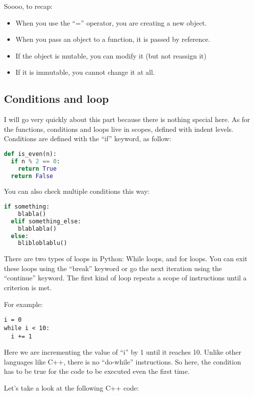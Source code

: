 \vspace{5mm}

Soooo, to recap:

\begin{itemize}
\item When you use the ``='' operator, you are creating a new object.
\item When you pass an object to a function, it is passed by reference.
\item If the object is mutable, you can modify it (but not reassign it)
\item If it is immutable, you cannot change it at all.
\end{itemize}

\subsection{Conditions and loop}
I will go very quickly about this part because there is nothing special here.
As for the functions, conditions and loops live in scopes, defined with indent levels.
Conditions are defined with the ``if'' keyword, as follow:

\begin{lstlisting}[language=python]
def is_even(n):
  if n % 2 == 0:
    return True
  return False
\end{lstlisting}

You can also check multiple conditions this way:
\begin{lstlisting}[language=python]
  if something:
    blabla()
  elif something_else:
    blablabla()
  else:
    blibloblablu()
\end{lstlisting}


There are two types of loops in Python: While loops, and for loops. You can exit
these loops using the ``break'' keyword or go the next iteration using the ``continue''
keyword. The first kind of loop repeats a scope of instructions until a criterion is met.

For example:

\begin{lstlisting}
i = 0
while i < 10:
  i += 1
\end{lstlisting}

Here we are incrementing the value of ``i'' by 1 until it reaches 10. Unlike other
languages like C++, there is no ``do-while'' instructions. So here, the condition has
to be true for the code to be executed even the first time.

Let's take a look at the following C++ code:

